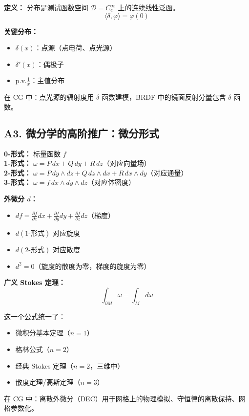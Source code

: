 \textbf{定义：} 分布是测试函数空间 $\mathcal{D} = C_c^\infty$ 上的连续线性泛函。
\[
\langle \delta, \varphi \rangle = \varphi(0)
\]

\textbf{关键分布：}
\begin{itemize}
  \item $\delta(x)$：点源（点电荷、点光源）
  \item $\delta'(x)$：偶极子
  \item $\text{p.v.}\frac{1}{x}$：主值分布
\end{itemize}

在 CG 中：点光源的辐射度用 $\delta$ 函数建模，BRDF 中的镜面反射分量包含 $\delta$ 函数。

\subsection{A3. 微分学的高阶推广：微分形式}

\textbf{0-形式：} 标量函数 $f$ \\
\textbf{1-形式：} $\omega = P\,dx + Q\,dy + R\,dz$（对应向量场） \\
\textbf{2-形式：} $\omega = P\,dy\wedge dz + Q\,dz\wedge dx + R\,dx\wedge dy$（对应通量） \\
\textbf{3-形式：} $\omega = f\,dx\wedge dy\wedge dz$（对应体密度）

\textbf{外微分 $d$：}
\begin{itemize}
  \item $df = \frac{\partial f}{\partial x}dx + \frac{\partial f}{\partial y}dy + \frac{\partial f}{\partial z}dz$（梯度）
  \item $d(\text{1-形式})$ 对应旋度
  \item $d(\text{2-形式})$ 对应散度
  \item $d^2 = 0$（旋度的散度为零，梯度的旋度为零）
\end{itemize}

\textbf{广义 Stokes 定理：}
\[
\boxed{\int_{\partial M} \omega = \int_M d\omega}
\]

这一个公式统一了：
\begin{itemize}
  \item 微积分基本定理（$n=1$）
  \item 格林公式（$n=2$）
  \item 经典 Stokes 定理（$n=2$，三维中）
  \item 散度定理/高斯定理（$n=3$）
\end{itemize}

在 CG 中：离散外微分（DEC）用于网格上的物理模拟、守恒律的离散保持、网格参数化。